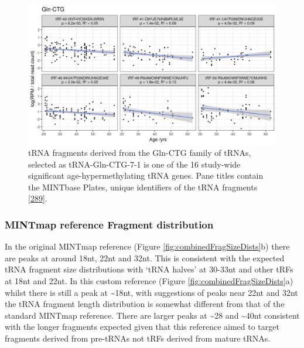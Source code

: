 \documentclass[
]{book}
\begin{document}
\begin{figure}

{\centering \includegraphics[width=1\linewidth]{./figs/nonSigIsoMapbbswsPlotsGln-CTG} 

}

\caption{tRNA fragments derived from the Gln-CTG family of tRNAs, selected as tRNA-Gln-CTG-7-1 is one of the 16 study-wide significant age-hypermethylating tRNA genes. Pane titles contain the MINTbase Plates, unique identifiers of the tRNA fragments {[}\protect\hyperlink{ref-Pliatsika2018}{289}{]}.}\label{fig:mintmapres}
\end{figure}



\hypertarget{mintmap-reference-fragment-distribution}{%
\subsubsection{MINTmap reference Fragment distribution}\label{mintmap-reference-fragment-distribution}}

In the original MINTmap reference (Figure \ref{fig:combinedFragSizeDists}b) there are peaks at around 18nt, 22nt and 32nt.
This is consistent with the expected tRNA fragment size distributions with `tRNA halves' at 30-33nt and other tRFs at 18nt and 22nt.
In this custom reference (Figure \ref{fig:combinedFragSizeDists}a) whilst there is still a peak at \textasciitilde18nt, with suggestions of peaks near 22nt and 32nt the tRNA fragment length distribution is somewhat different from that of the standard MINTmap reference.
There are larger peaks at \textasciitilde28 and \textasciitilde40nt consistent with the longer fragments expected given that this reference aimed to target fragments derived from pre-tRNAs not tRFs derived from mature tRNAs.
\end{document}
